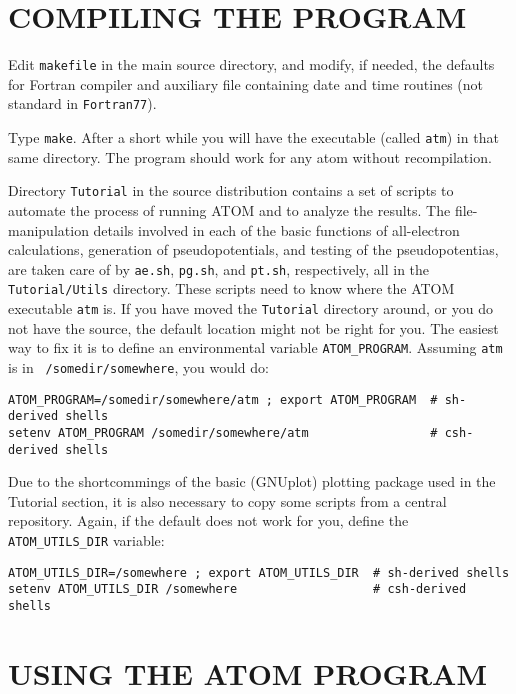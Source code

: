 \documentclass[11pt]{article}
\begin{document}
\section{COMPILING THE PROGRAM}

Edit {\tt makefile} in the main source directory, and modify, if
needed, the defaults for Fortran compiler and auxiliary file
containing date and time routines (not standard in {\tt Fortran77}).

Type {\tt make}. After a short while you will have the executable (called
{\tt atm}) in that same directory. The program should work for any atom
without recompilation. 

Directory {\tt Tutorial} in the source distribution contains a set of
scripts to automate the process of running {\sc ATOM} and to analyze
the results. The file-manipulation details involved in each of the
basic functions of all-electron calculations, generation of
pseudopotentials, and testing of the pseudopotentias, are taken care
of by {\tt ae.sh}, {\tt pg.sh}, and {\tt pt.sh}, respectively, all in
the {\tt Tutorial/Utils} directory.  These
scripts need to know where the {\sc ATOM} executable {\tt atm}
is. If you have moved the {\tt Tutorial} directory around, or you do
not have the source, the default location might not be right for you.
The easiest way to fix it is to define an environmental
variable {\tt ATOM\_PROGRAM}. Assuming {\tt atm} is in {\tt
/somedir/somewhere}, you would do:
%
\begin{verbatim}
ATOM_PROGRAM=/somedir/somewhere/atm ; export ATOM_PROGRAM  # sh-derived shells
setenv ATOM_PROGRAM /somedir/somewhere/atm                 # csh-derived shells
\end{verbatim}
%

Due to the shortcommings of the basic (GNUplot) plotting package used in the
Tutorial section, it is also necessary to copy some scripts from a
central repository. Again, if the default does not work for you,
define the {\tt ATOM\_UTILS\_DIR} variable:

\begin{verbatim}
ATOM_UTILS_DIR=/somewhere ; export ATOM_UTILS_DIR  # sh-derived shells
setenv ATOM_UTILS_DIR /somewhere                   # csh-derived shells
\end{verbatim}
%

\section{USING THE ATOM PROGRAM}
\end{document}
